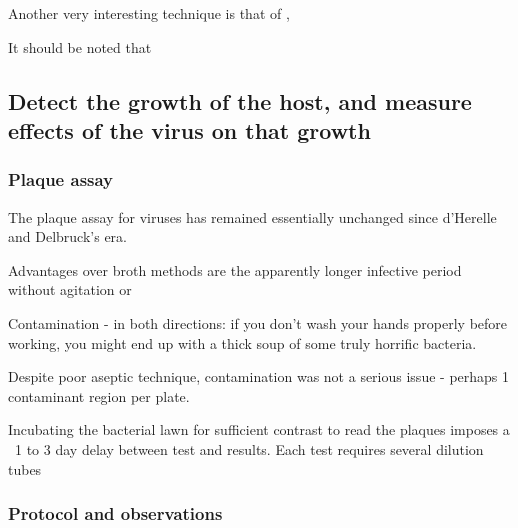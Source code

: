 \documentclass[paper.tex]{subfiles}
\begin{document}
Another very interesting technique is that of \cite{Study2003}, 



























It should be noted that 

\subsection{Detect the growth of the host, and measure effects of the virus on that growth}

\subsubsection{Plaque assay}

The plaque assay for viruses has remained essentially unchanged since d'Herelle and Delbruck's era.

Advantages over broth methods are the apparently longer infective period without agitation or 

Contamination - in both directions: if you don’t wash your hands properly before working, you might end up with a thick soup of some truly horrific bacteria.

Despite poor aseptic technique, contamination was not a serious issue - perhaps 1 contaminant region per plate.

Incubating the bacterial lawn for sufficient contrast to read the plaques imposes a ~1 to 3 day delay between test and results. Each test requires several dilution tubes

\subsubsection{Protocol and observations}
\end{document}
